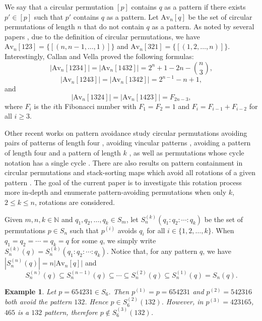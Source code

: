 \documentclass[10pt,a4paper]{amsart}
\newtheorem{example}[theorem]{Example}
\numberwithin{equation}{section}
\begin{document}
We say that a circular permutation $[p]$ contains $q$ as a pattern if there 
exists $p'\in[p]$ such that $p'$ contains $q$ as a pattern. Let $\text{Av}_n[q]$ 
be the set of circular permutations of length $n$ that do not contain $q$ as a pattern. As noted by several papers \cite{Callan2002,DELMSSS2022}, due to the definition of circular permutations, we have $
\text{Av}_n[123]=\{[(n,n-1,\ldots,1)]\}$ and $
\text{Av}_n[321]=\{[(1,2,\ldots,n)]\}$. Interestingly, Callan \cite{Callan2002} and Vella \cite{Vella2003} proved the 
following formulas:
\[
|\text{Av}_n[1234]|=|\text{Av}_n[1432]|=2^n+1-2n-\binom{n}{3},
\]
\[
|\text{Av}_n[1243]|=|\text{Av}_n[1342]|=2^{n-1}-n+1,
\]
and
\[
|\text{Av}_n[1324]|=|\text{Av}_n[1423]|=F_{2n-3},
\]
where $F_i$ is the $i$th Fibonacci number with $F_1=F_2=1$ and $F_{i}=F_{i-1}+F_{i-2}$ for all $i\geq3$.

Other recent works on pattern avoidance study circular permutations avoiding pairs of patterns of length four \cite{DELMSSS2022}, avoiding vincular patterns \cite{ES2021,Li2022,MS2021}, avoiding a pattern of length four and a pattern of length $k$ \cite{MS2022}, as well as permutations whose cycle notation has a single cycle \cite{ABBGJ2023,ABBGJ2025}. There are also results on pattern containment in circular permutations \cite{DELMSSS2022,GLW2018} and stack-sorting maps which avoid all rotations of a given pattern \cite{ZB2026}. The goal of the current paper is to investigate this rotation process more in-depth and enumerate pattern-avoiding permutations when only $k$, $2\leq k\leq n$, rotations are considered. 

Given $m,n,k\in\mathbb{N}$ and $q_1,q_2,\ldots,q_k\in S_m$, let $S_{n}^{(k)}(q_1:q_2:\cdots:q_k)$ be the set of permutations $p\in S_n$ such that $p^{(i)}$ avoids $q_i$ for all $i\in\{1,2,\ldots,k\}$. When $q_1=q_2=\cdots=q_k=q$ for some $q$, we simply write $S_n^{(k)}(q)=S_n^{(k)}(q_1:q_2:\cdots:q_k)$. Notice that, for any pattern $q$, we have $|S_n^{(n)}(q)|=n|\text{Av}_n[q]|$ and 
\[
S_n^{(n)}(q)\subseteq S_n^{(n-1)}(q)\subseteq\cdots\subseteq S_n^{(2)}(q)\subseteq S_n^{(1)}(q)=S_n(q).
\]

\begin{example}
    Let $p=654231\in S_6$. Then $p^{(1)}=p=654231$ and $p^{(2)}=542316$ both avoid the pattern $132$. Hence $p\in S_6^{(2)}(132)$. 
However, in $p^{(3)}=423165$, $465$ is a $132$ pattern, therefore $p\notin S_6^{(3)}(132)$.
\end{example}
\end{document}
